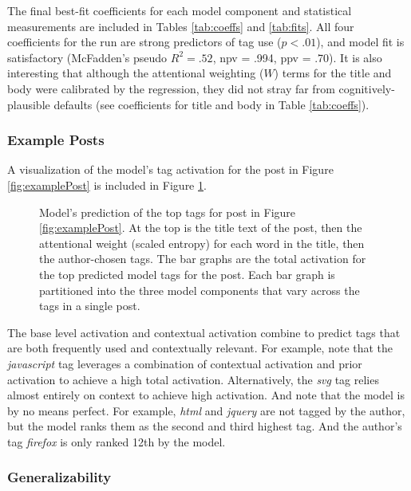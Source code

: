 \documentclass[10pt,letterpaper]{article}
\begin{document}
The final best-fit coefficients for each model component and statistical measurements are included in Tables \ref{tab:coeffs} and \ref{tab:fits}.
All four coefficients for the run are strong predictors of tag use ($p<.01$), and model fit is satisfactory (McFadden's pseudo $R_{}^{2}=.52$, npv = .994, ppv = .70).
It is also interesting that although the attentional weighting ($W$) terms for the title and body were calibrated by the regression, they did not stray far from cognitively-plausible defaults
(see coefficients for title and body in Table \ref{tab:coeffs}).

\subsubsection{Example Posts}

A visualization of the model's tag activation for the post in Figure \ref{fig:examplePost} is included in Figure \ref{fig:modelPost}.

\begin{figure}[ht]
  \centering
  \caption{
    Model's prediction of the top tags for post in Figure \ref{fig:examplePost}.
    At the top is the title text of the post, then the attentional weight (scaled entropy) for each word in the title, then the author-chosen tags.
    The bar graphs are the total activation for the top predicted model tags for the post.
    Each bar graph is partitioned into the three model components that vary across the tags in a single post.
}
  \label{fig:modelPost}
\end{figure}

The base level activation and contextual activation combine to predict tags that are both frequently used and contextually relevant.
For example, note that the \emph{javascript} tag leverages a combination of contextual activation and prior activation to achieve a high total activation.
Alternatively, the \emph{svg} tag relies almost entirely on context to achieve high activation.
And note that the model is by no means perfect.
For example, \emph{html} and \emph{jquery} are not tagged by the author, but the model ranks them as the second and third highest tag.
And the author's tag \emph{firefox} is only ranked 12th by the model.

\subsubsection{Generalizability}
\end{document}
